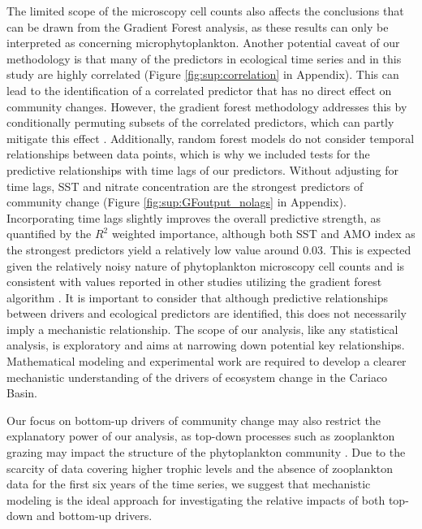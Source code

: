 \documentclass[draft]{agujournal2019}
\begin{document}
The limited scope of the microscopy cell counts also affects the conclusions that can be drawn from the Gradient Forest analysis, as these results can only be interpreted as concerning microphytoplankton. 
Another potential caveat of our methodology is that many of the predictors in ecological time series and in this study are highly correlated (Figure \ref{fig:sup:correlation} in Appendix). This can lead to the identification of a correlated predictor that has no direct effect on community changes. However, the gradient forest methodology addresses this by conditionally permuting subsets of the correlated predictors, which can partly mitigate this effect \cite{ellis_gradient_2012}. Additionally, random forest models do not consider temporal relationships between data points, which is why we included tests for the predictive relationships with time lags of our predictors. Without adjusting for time lags, SST and nitrate concentration are the strongest predictors of community change (Figure \ref{fig:sup:GFoutput_nolags} in Appendix). Incorporating time lags slightly improves the overall predictive strength, as quantified by the $R^2$ weighted importance, although both SST and AMO index as the strongest predictors yield a relatively low value around \qty{0.03}{}. This is expected given the relatively noisy nature of phytoplankton microscopy cell counts and is consistent with values reported in other studies utilizing the gradient forest algorithm \cite{pitcher_example_2012, roland_pitcher_exploring_2012, roubeix_identification_2016, samhouri_defining_2017, fraker_temporal_2022}. It is important to consider that although predictive relationships between drivers and ecological predictors are identified, this does not necessarily imply a mechanistic relationship. The scope of our analysis, like any statistical analysis, is exploratory and aims at narrowing down potential key relationships. Mathematical modeling and experimental work are required to develop a clearer mechanistic understanding of the drivers of ecosystem change in the Cariaco Basin.
 
Our focus on bottom-up drivers of community change may also restrict the explanatory power of our analysis, as top-down processes such as zooplankton grazing may impact the structure of the phytoplankton community \cite{frank_ups_2007, banas_adding_2011, acevedo-trejos_mechanisms_2015}. Due to the scarcity of data covering higher trophic levels and the absence of zooplankton data for the first six years of the time series, we suggest that mechanistic modeling is the ideal approach for investigating the relative impacts of both top-down and bottom-up drivers.
\end{document}
